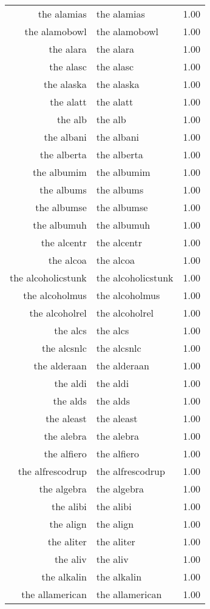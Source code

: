 \begin{table}[ht]
\begin{tabular}{rlr}
  the alamias & the alamias & 1.00 \\ 
  the alamobowl & the alamobowl & 1.00 \\ 
  the alara & the alara & 1.00 \\ 
  the alasc & the alasc & 1.00 \\ 
  the alaska & the alaska & 1.00 \\ 
  the alatt & the alatt & 1.00 \\ 
  the alb & the alb & 1.00 \\ 
  the albani & the albani & 1.00 \\ 
  the alberta & the alberta & 1.00 \\ 
  the albumim & the albumim & 1.00 \\ 
  the albums & the albums & 1.00 \\ 
  the albumse & the albumse & 1.00 \\ 
  the albumuh & the albumuh & 1.00 \\ 
  the alcentr & the alcentr & 1.00 \\ 
  the alcoa & the alcoa & 1.00 \\ 
  the alcoholicstunk & the alcoholicstunk & 1.00 \\ 
  the alcoholmus & the alcoholmus & 1.00 \\ 
  the alcoholrel & the alcoholrel & 1.00 \\ 
  the alcs & the alcs & 1.00 \\ 
  the alcsnlc & the alcsnlc & 1.00 \\ 
  the alderaan & the alderaan & 1.00 \\ 
  the aldi & the aldi & 1.00 \\ 
  the alds & the alds & 1.00 \\ 
  the aleast & the aleast & 1.00 \\ 
  the alebra & the alebra & 1.00 \\ 
  the alfiero & the alfiero & 1.00 \\ 
  the alfrescodrup & the alfrescodrup & 1.00 \\ 
  the algebra & the algebra & 1.00 \\ 
  the alibi & the alibi & 1.00 \\ 
  the align & the align & 1.00 \\ 
  the aliter & the aliter & 1.00 \\ 
  the aliv & the aliv & 1.00 \\ 
  the alkalin & the alkalin & 1.00 \\ 
  the allamerican & the allamerican & 1.00 \\ 

\end{tabular}
\end{table}
